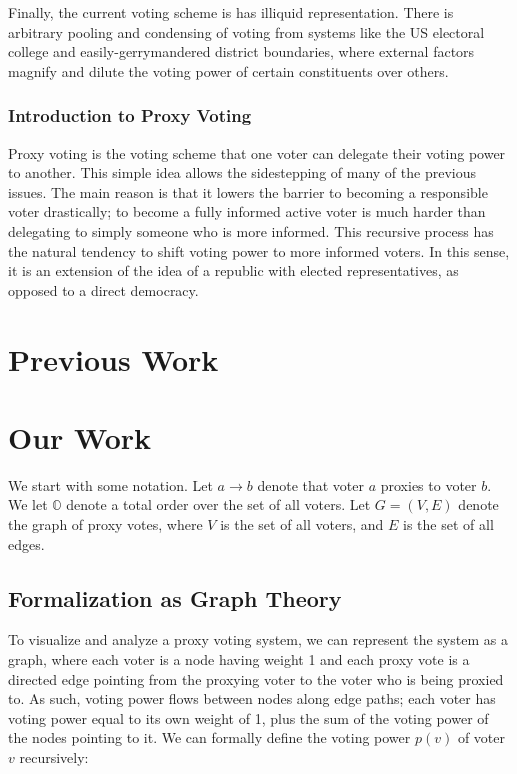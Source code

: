 \documentclass[10pt]{article}
\theoremstyle{definition}
\newcommand{\bb}[1]{\mathbb{#1}}
\begin{document}
Finally, the current voting scheme is has illiquid representation. There is arbitrary pooling and condensing of voting from systems like the US electoral college and easily-gerrymandered district boundaries, where external factors magnify and dilute the voting power of certain constituents over others.

\subsubsection{Introduction to Proxy Voting}

Proxy voting is the voting scheme that one voter can delegate their voting power to another. This simple idea allows the sidestepping of many of the previous issues. The main reason is that it lowers the barrier to becoming a responsible voter drastically; to become a fully informed active voter is much harder than delegating to simply someone who is more informed. This recursive process has the natural tendency to shift voting power to more informed voters. In this sense, it is an extension of the idea of a republic with elected representatives, as opposed to a direct democracy.

\section{Previous Work}


\section{Our Work}

We start with some notation. Let $a \rightarrow b$ denote that voter $a$ proxies to voter $b$. We let $\bb{O}$ denote a total order over the set of all voters. Let $G = (V,E)$ denote the graph of proxy votes, where $V$ is the set of all voters, and $E$ is the set of all edges.

\subsection{Formalization as Graph Theory}
To visualize and analyze a proxy voting system, we can represent the system as a graph, where each voter is a node having weight 1 and each proxy vote is a directed edge pointing from the proxying voter to the voter who is being proxied to. As such, voting power flows between nodes along edge paths; each voter has voting power equal to its own weight of 1, plus the sum of the voting power of the nodes pointing to it. We can formally define the voting power $p(v)$ of voter $v$ recursively:
\end{document}
